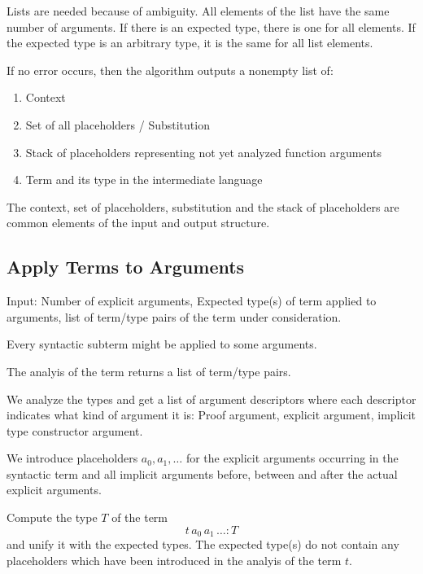 Lists are needed because of ambiguity. All elements of the list have the same
number of arguments. If there is an expected type, there is one for all
elements. If the expected type is an arbitrary type, it is the same for all
list elements.

If no error occurs, then the algorithm outputs a nonempty list of:

\begin{enumerate}

\item Context

\item Set of all placeholders / Substitution

\item Stack of placeholders representing not yet analyzed function arguments

\item Term and its type in the intermediate language

\end{enumerate}

The context, set of placeholders, substitution and the stack of placeholders
are common elements of the input and output structure.






\subsection{Apply Terms to Arguments}
\label{sec:apply-terms-to_arguments}



Input: Number of explicit arguments, Expected type(s) of term applied to
arguments, list of term/type pairs of the term under consideration.

Every syntactic subterm might be applied to some arguments.

The analyis of the term returns a list of term/type pairs.

We analyze the types and get a list of argument descriptors where each
descriptor indicates what kind of argument it is: Proof argument, explicit
argument, implicit type constructor argument.

We introduce placeholders $a_0, a_1, \ldots$ for the explicit arguments
occurring in the syntactic term and all implicit arguments before, between and
after the actual explicit arguments.

Compute the type $T$ of the term
$$
t \, a_0 \, a_1 \, \ldots : T
$$
and unify it with the expected types. The expected type(s) do not contain any
placeholders which have been introduced in the analyis of the term $t$.

